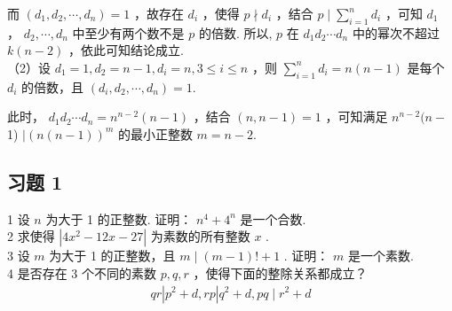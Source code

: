而 $\left(d_{1}, d_{2}, \cdots, d_{n}\right)=1$ ，故存在 $d_{i}$ ，使得 $p \nmid d_{i}$ ，结合 $p \mid \sum_{i=1}^{n} d_{i}$ ，可知 $d_{1}$ ， $d_{2}, \cdots, d_{n}$ 中至少有两个数不是 $p$ 的倍数. 所以, $p$ 在 $d_{1} d_{2} \cdots d_{n}$ 中的幂次不超过 $k(n-2)$ ，依此可知结论成立. \\
（2）设 $d_{1}=1, d_{2}=n-1, d_{i}=n, 3 \leqslant i \leqslant n$ ，则 $\sum_{i=1}^{n} d_{i}=n(n-1)$ 是每个 $d_{i}$ 的倍数，且 $\left(d_{i}, d_{2}, \cdots, d_{n}\right)=1$.

此时， $d_{1} d_{2} \cdots d_{n}=n^{n-2}(n-1)$ ，结合 $(n, n-1)=1$ ，可知满足 $n^{n-2}(n-$ 1) $\mid(n(n-1))^{m}$ 的最小正整数 $m=n-2$.

\subsection{习题 1}
1 设 $n$ 为大于 1 的正整数. 证明： $n^{4}+4^{n}$ 是一个合数. \\
2 求使得 $\left|4 x^{2}-12 x-27\right|$ 为素数的所有整数 $x$ . \\
3 设 $m$ 为大于 1 的正整数，且 $m \mid(m-1)!+1$ . 证明： $m$ 是一个素数. \\
4 是否存在 3 个不同的素数 $p ,  q ,  r$ ，使得下面的整除关系都成立？\\
\begin{align*}
q r\left|p^{2}+d, r p\right| q^{2}+d, p q \mid r^{2}+d
\end{align*}

